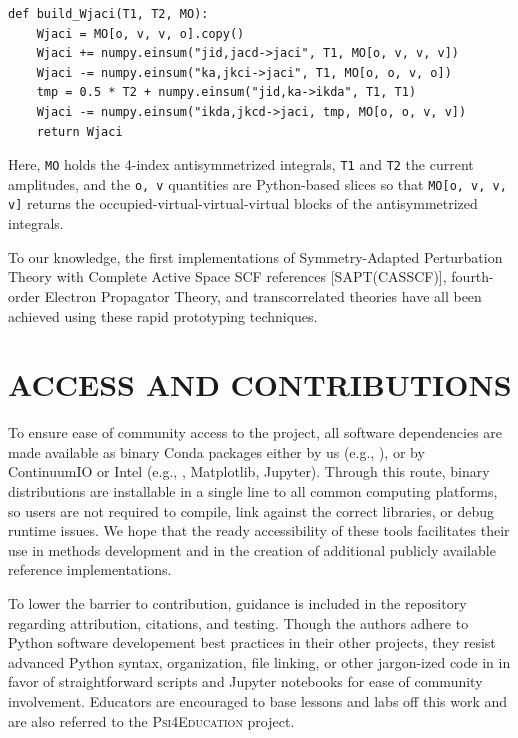 \documentclass[%
  class = book,%
  crop = false,%
  float = true,%
  multi = true,%
  preview = false,%
]{standalone}
\let\cite\autocite
\newcommand{\caps}[1]{\uppercase{#1}}
\begin{document}
\begin{verbatim}
def build_Wjaci(T1, T2, MO):
    Wjaci = MO[o, v, v, o].copy()
    Wjaci += numpy.einsum("jid,jacd->jaci", T1, MO[o, v, v, v])
    Wjaci -= numpy.einsum("ka,jkci->jaci", T1, MO[o, o, v, o])
    tmp = 0.5 * T2 + numpy.einsum("jid,ka->ikda", T1, T1)
    Wjaci -= numpy.einsum("ikda,jkcd->jaci, tmp, MO[o, o, v, v])
    return Wjaci
\end{verbatim}
Here, \texttt{MO} holds the 4-index antisymmetrized integrals, \texttt{T1} and \texttt{T2} the current amplitudes, and the \texttt{o, v} quantities are Python-based slices so that \texttt{MO[o, v, v, v]} returns the occupied-virtual-virtual-virtual blocks of the antisymmetrized integrals.

To our knowledge, the first implementations of Symmetry-Adapted Perturbation Theory with Complete Active Space SCF references [SAPT(CASSCF)], fourth-order Electron Propagator Theory, and transcorrelated theories have all been achieved using these rapid prototyping techniques.

\section{\texorpdfstring{\caps{Access and Contributions}}{Access and Contributions}}

To ensure ease of community access to the \pfn project, all software dependencies are made available as binary Conda packages\cite{ContinuumIO} either by us (e.g., \pfour), or by ContinuumIO or Intel (e.g., \numpy, Matplotlib, Jupyter). Through this route, binary distributions are installable in a single line to all common computing platforms, so users are not required to compile, link against the correct libraries, or debug runtime issues. We hope that the ready accessibility of these tools facilitates their use in methods development and in the creation of additional publicly available reference implementations.

To lower the barrier to contribution, guidance is included in the repository regarding attribution, citations, and testing. Though the authors adhere to Python software developement best practices in their other projects, they resist advanced Python syntax, organization, file linking, or other jargon-ized code in \pfn in favor of straightforward scripts and Jupyter notebooks for ease of community involvement.  Educators are encouraged to base lessons and labs off this work and are also referred to the \textsc{Psi4Education} project\cite{psi4edu}.
\end{document}
